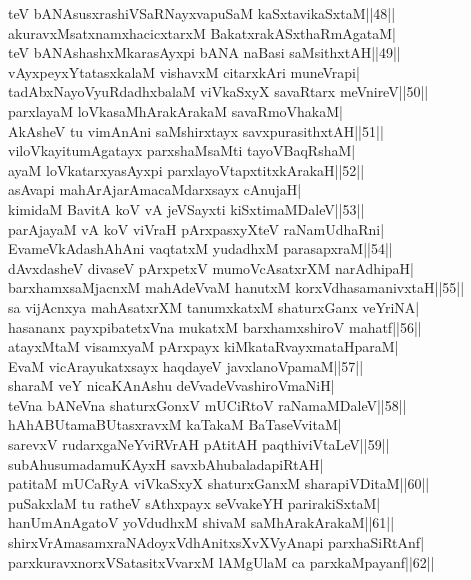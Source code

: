 \documentclass{article}
\begin{document}
teV bANAsusxrashiVSaRNayxvapuSaM kaSxtavikaSxtaM||48||\\
akuravxMsatxnamxhacicxtarxM BakatxrakASxthaRmAgataM|\\
teV bANAshashxMkarasAyxpi bANA naBasi saMsithxtAH||49||\\
vAyxpeyxYtatasxkalaM vishavxM citarxkAri muneVrapi|\\
tadAbxNayoVyuRdadhxbalaM viVkaSxyX savaRtarx meVnireV||50||\\
parxlayaM loVkasaMhArakArakaM savaRmoVhakaM|\\
AkAsheV tu vimAnAni saMshirxtayx savxpurasithxtAH||51||\\
viloVkayitumAgatayx parxshaMsaMti tayoVBaqRshaM|\\
ayaM loVkatarxyasAyxpi parxlayoVtapxtitxkArakaH||52||\\
asAvapi mahArAjarAmacaMdarxsayx cAnujaH|\\
kimidaM BavitA koV vA jeVSayxti kiSxtimaMDaleV||53||\\
parAjayaM vA koV viVraH pArxpasxyXteV raNamUdhaRni|\\
EvameVkAdashAhAni vaqtatxM yudadhxM parasapxraM||54||\\
dAvxdasheV divaseV pArxpetxV mumoVcAsatxrXM narAdhipaH|\\
barxhamxsaMjacnxM mahAdeVvaM hanutxM korxVdhasamanivxtaH||55||\\
sa vijAcnxya mahAsatxrXM tanumxkatxM shaturxGanx veYriNA|\\
hasananx payxpibatetxVna mukatxM barxhamxshiroV mahatf||56||\\
atayxMtaM visamxyaM pArxpayx kiMkataRvayxmataHparaM|\\
EvaM vicArayukatxsayx haqdayeV javxlanoVpamaM||57||\\
sharaM veY nicaKAnAshu deVvadeVvashiroVmaNiH|\\
teVna bANeVna shaturxGonxV mUCiRtoV raNamaMDaleV||58||\\
hAhABUtamaBUtasxravxM kaTakaM BaTaseVvitaM|\\
sarevxV rudarxgaNeYviRVrAH pAtitAH paqthiviVtaLeV||59||\\
subAhusumadamuKAyxH savxbAhubaladapiRtAH|\\
patitaM mUCaRyA viVkaSxyX shaturxGanxM sharapiVDitaM||60||\\
puSakxlaM tu ratheV sAthxpayx seVvakeYH parirakiSxtaM|\\
hanUmAnAgatoV yoVdudhxM shivaM saMhArakArakaM||61||\\
shirxVrAmasamxraNAdoyxVdhAnitxsXvXVyAnapi parxhaSiRtAnf|\\
parxkuravxnorxVSatasitxVvarxM lAMgUlaM ca parxkaMpayanf||62||\\
\end{document}
